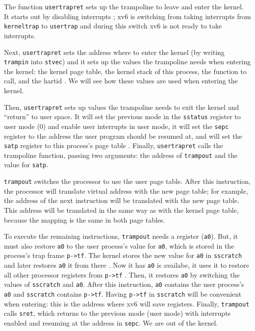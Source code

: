 The function \lstinline{usertrapret}
 sets up the trampoline to leave
and enter the kernel.  It starts out by disabling interrupts
; xv6 is switching from taking
interrupts from \lstinline{kerneltrap} to \lstinline{usertrap} and
during this switch xv6 is not ready to take interrupts.

Next, \lstinline{usertrapret} sets the address where to enter the
kernel (by writing \lstinline{trampin} into \lstinline{stvec}) and it
sets up the values the trampoline needs when entering the kernel: the
kernel page table, the kernel stack of this process, the function to
call, and the hartid
.  We will see
how these values are used when entering the kernel.

Then, \lstinline{usertrapret} sets up values the trampoline needs to
exit the kernel and ``return'' to user space.  It will set the
previous mode in the \lstinline{sstatus} register to user mode (0) and
enable user interrupts in user mode, it will set the \lstinline{sepc}
register to the address the user program should be resumed at, and
will set the \lstinline{satp} register to this process's page table
.
Finally, \lstinline{usertrapret} calls
the trampoline function, passing two arguments: the address of
\lstinline{trampout} and the value for \lstinline{satp}.

\lstinline{trampout}  switches
the processor to use the user page table.  After this instruction, the
processor will translate virtual address with the new page table; for
example, the address of the next instruction will be translated with
the new page table.  This address will be translated in the same way
as with the kernel page table, because the mapping is the same in both
page tables.

To execute the remaining instructions, \lstinline{trampout} needs a
register (\lstinline{a0}). But, it must also restore \lstinline{a0} to
the user process's value for \lstinline{a0}, which is stored in the
process's trap frame \lstinline{p->tf}.  The kernel stores the new
value for \lstinline{a0} in \lstinline{sscratch} and later restores
\lstinline{a0} it from there .
Now it has \lstinline{a0} is availabe, it uses it to restore all other
processor registers from \lstinline{p->tf}
.  Then, it restores
\lstinline{a0} by switching the values of \lstinline{sscratch} and
\lstinline{a0}. After this instruction, \lstinline{a0} contains the
user process's \lstinline{a0} and \lstinline{sscratch} contains
\lstinline{p->tf}.  Having \lstinline{p->tf} in \lstinline{sscratch}
will be convenient when entering: this is the address where xv6 will
save registers.  Finally, \lstinline{trampout} calls \lstinline{sret},
which returns to the previous mode (user mode) with interrupts enabled
and resuming at the address in \lstinline{sepc}.  We are out of the
kernel.

